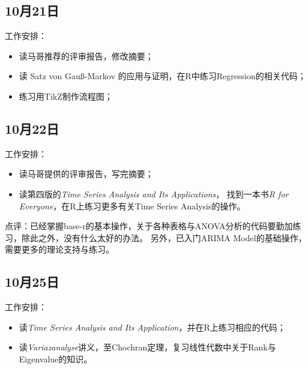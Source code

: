\documentclass[H:\workspace\实习日志\ShixiRizhi.tex]{subfiles}
\begin{document}
\subsection{10月21日}
工作安排：
\begin{itemize}
    \item 读马哥推荐的评审报告，修改摘要；
    \item 读 Satz von Gauß-Markov 的应用与证明，在R中练习Regression的相关代码；
    \item 练习用TikZ制作流程图；
\end{itemize}

\subsection{10月22日}
工作安排：
\begin{itemize}
    \item 读马哥提供的评审报告，写完摘要；
    \item 读第四版的\textit{Time Series Analysis and Its Applications}，
    找到一本书\textit{R for Everyone}，在R上练习更多有关Time Series Analysis的操作。
\end{itemize}
点评：已经掌握base-r的基本操作，关于各种表格与ANOVA分析的代码要勤加练习，除此之外，没有什么太好的办法。
另外，已入门ARIMA Model的基础操作，需要更多的理论支持与练习。

\subsection{10月25日}
工作安排：
\begin{itemize}
    \item 读\textit{Time Series Analysis and Its Application}，并在R上练习相应的代码；
    \item 读\textit{Variazanalyse}讲义，至Chochran定理，复习线性代数中关于Rank与Eigenvalue的知识。
\end{itemize}  
\end{document}
